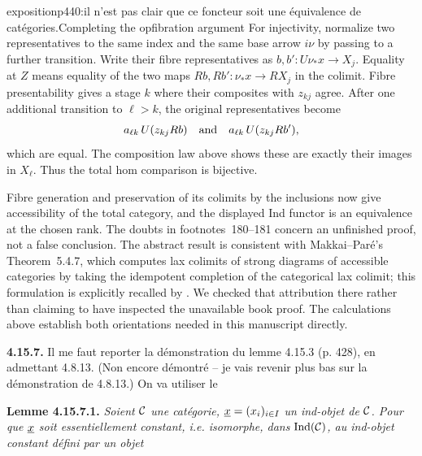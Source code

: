\begin{dcomment}{exposition}{p440:il n'est pas clair que ce foncteur soit une équivalence de catégories.}{Completing the opfibration argument}
For injectivity, normalize two representatives to the same index and the same base arrow $i\nu$ by passing to a further transition. Write their fibre representatives as $b,b':U\nu_*x\to X_j$. Equality at $Z$ means equality of the two maps $Rb,Rb':\nu_*x\to RX_j$ in the colimit. Fibre presentability gives a stage $k$ where their composites with $z_{kj}$ agree. After one additional transition to $\ell>k$, the original representatives become
\[
 a_{\ell k}\,U(z_{kj}Rb)
 \quad\hbox{and}\quad
 a_{\ell k}\,U(z_{kj}Rb'),
\]
which are equal. The composition law above shows these are exactly their images in $X_\ell$. Thus the total hom comparison is bijective.

Fibre generation and preservation of its colimits by the inclusions now give accessibility of the total category, and the displayed Ind functor is an equivalence at the chosen rank. The doubts in footnotes~180--181 concern an unfinished proof, not a false conclusion. The abstract result is consistent with Makkai--Par\'e's Theorem~5.4.7, which computes lax colimits of strong diagrams of accessible categories by taking the idempotent completion of the categorical lax colimit; this formulation is explicitly recalled by \citet[Introduction]{PareRosicky2013}. We checked that attribution there rather than claiming to have inspected the unavailable book proof. The calculations above establish both orientations needed in this manuscript directly.
\end{dcomment}


\textbf{4.15.7.} Il me faut reporter la démonstration du lemme 4.15.3 (p. 428), en admettant 4.8.13. (Non encore démontré -- je vais revenir plus bas sur la démonstration de 4.8.13.) On va utiliser le

\textbf{Lemme 4.15.7.1.} \textit{Soient $\mathcal{C}$ une catégorie, $\underline{x} = (x_i)_{i\in I}$ un ind-objet de $\mathcal{C}$. Pour que $\underline{x}$ soit essentiellement constant, i.e. isomorphe, dans} $\operatorname{Ind}(\mathcal{C})$\textit{, au ind-objet constant défini par un objet}

